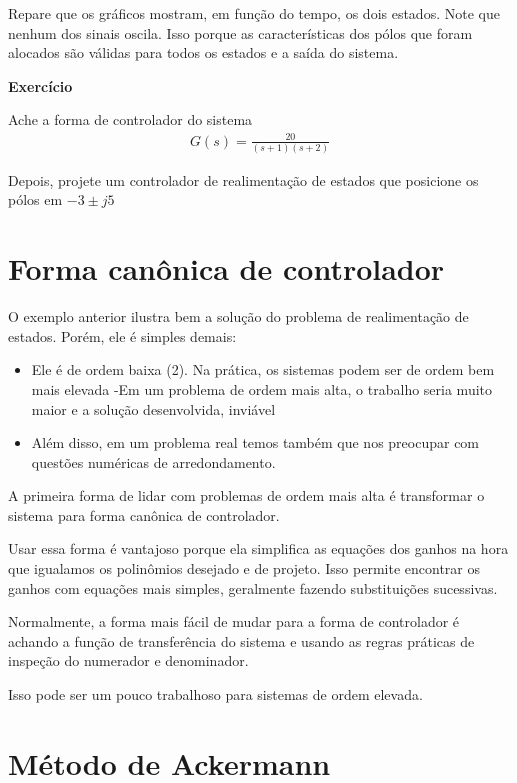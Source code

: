 \documentclass[
]{book}
\providecommand{\tightlist}{%
  \setlength{\itemsep}{0pt}\setlength{\parskip}{0pt}}
\begin{document}
Repare que os gráficos mostram, em função do tempo, os
dois estados. Note que nenhum dos sinais oscila. Isso porque as características dos pólos que foram alocados são válidas para todos os estados e a saída do
sistema.

\textbf{Exercício}

Ache a forma de controlador do sistema
\begin{align}
    G(s) = \frac{20}{(s+1)(s+2)}
\end{align}

Depois, projete um controlador de realimentação de estados que posicione
os pólos em \(-3\pm j5\)

\hypertarget{forma-canuxf4nica-de-controlador}{%
\section{Forma canônica de controlador}\label{forma-canuxf4nica-de-controlador}}

O exemplo anterior ilustra bem a solução do problema de realimentação de
estados. Porém, ele é simples demais:

\begin{itemize}
\tightlist
\item
  Ele é de ordem baixa (2). Na
  prática, os sistemas podem ser de ordem bem mais elevada
  -Em um problema de ordem mais alta, o trabalho seria muito maior e a solução
  desenvolvida, inviável
\item
  Além disso, em um problema real temos também
  que nos preocupar com questões numéricas de arredondamento.
\end{itemize}

A primeira forma de lidar com problemas de ordem mais alta é transformar
o sistema para forma canônica de controlador.

Usar essa forma é vantajoso porque ela simplifica as equações dos ganhos
na hora que igualamos os polinômios desejado e de projeto. Isso permite
encontrar os ganhos com equações mais simples, geralmente fazendo
substituições sucessivas.

Normalmente, a forma mais fácil de mudar para a forma de controlador é
achando a função de transferência do sistema e usando as regras práticas
de inspeção do numerador e denominador.

Isso pode ser um pouco trabalhoso para sistemas de ordem elevada.

\hypertarget{muxe9todo-de-ackermann}{%
\section{Método de Ackermann}\label{muxe9todo-de-ackermann}}
\end{document}
